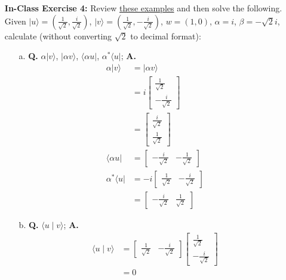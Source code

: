 \documentclass[main.tex]{subfiles}
\begin{document}
\begin{enumerate}
\begin{enumerate}
    \end{enumerate}

\item[] \textbf{In-Class Exercise 4:} Review \href{https://www2.seas.gwu.edu/~simhaweb/quantum/modules/module2/problems2.html#vectors}{these examples} and then solve the following. Given $|u\rangle=\left(\frac{1}{\sqrt{2}}, \frac{i}{\sqrt{2}}\right)$, $|v\rangle=\left(\frac{1}{\sqrt{2}}, -\frac{i}{\sqrt{2}}\right)$, $w=(1,0)$, $\alpha=i$, $\beta=-\sqrt{2}i$, calculate (without converting $\sqrt{2}$ to decimal format):

    \begin{enumerate}
        \item[a.] \textbf{Q.} $\alpha|v\rangle$, $|\alpha v\rangle$, $\langle\alpha u|$, $\alpha^{*}\langle u |$; \textbf{A.}
        \begin{align*}
            \alpha|v\rangle         & = |\alpha v\rangle\\ 
                                    & = i \left[\begin{array}{l}\frac{1}{\sqrt{2}}\\-\frac{i}{\sqrt{2}}\end{array}\right]\\ 
                                    & = \left[\begin{array}{l}\frac{i}{\sqrt{2}}\\\frac{1}{\sqrt{2}}\end{array}\right]\\
            \langle\alpha u|        & = \left[\begin{array}{ll} -\frac{i}{\sqrt{2}} & -\frac{1}{\sqrt{2}}\end{array}\right] \\
            \alpha^{*}\langle u |   &= -i \left[\begin{array}{ll} \frac{1}{\sqrt{2}} & -\frac{i}{\sqrt{2}}\end{array}\right] \\
                                    &= \left[\begin{array}{ll} -\frac{i}{\sqrt{2}} & \frac{1}{\sqrt{2}}\end{array}\right]
        \end{align*}
        
        \item[b.] \textbf{Q.} $\langle u \mid v\rangle$; \textbf{A.}
        \begin{align*}
            \langle u \mid v\rangle & = \left[\begin{array}{ll} \frac{1}{\sqrt{2}} & -\frac{i}{\sqrt{2}} \end{array}\right] \left[\begin{array}{r} \frac{1}{\sqrt{2}} \\ -\frac{i}{\sqrt{2}} \end{array}\right]\\
                                    & = 0
        \end{align*} 
        

\end{enumerate}
\end{enumerate}
\end{document}
